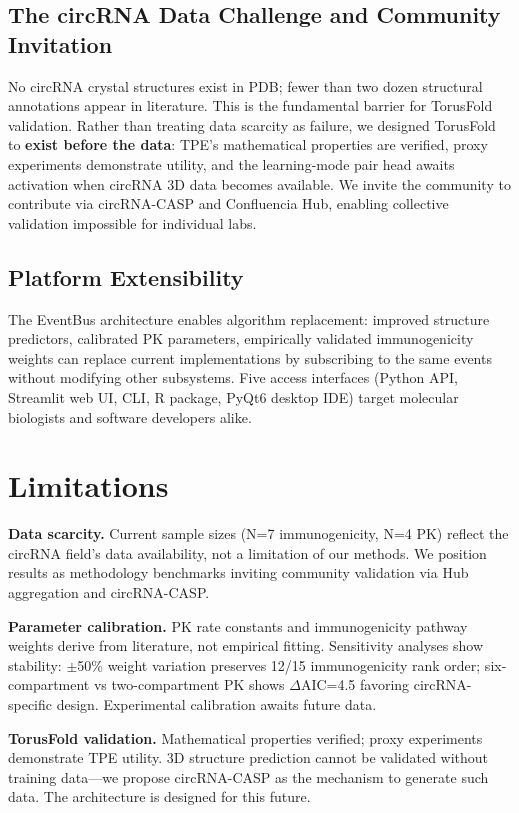\documentclass[12pt,a4paper]{article}
\begin{document}
\subsection{The circRNA Data Challenge and Community Invitation}

No circRNA crystal structures exist in PDB; fewer than two dozen structural annotations appear in literature. This is the fundamental barrier for TorusFold validation. Rather than treating data scarcity as failure, we designed TorusFold to \textbf{exist before the data}: TPE's mathematical properties are verified, proxy experiments demonstrate utility, and the learning-mode pair head awaits activation when circRNA 3D data becomes available. We invite the community to contribute via circRNA-CASP and Confluencia Hub, enabling collective validation impossible for individual labs.

\subsection{Platform Extensibility}

The EventBus architecture enables algorithm replacement: improved structure predictors, calibrated PK parameters, empirically validated immunogenicity weights can replace current implementations by subscribing to the same events without modifying other subsystems. Five access interfaces (Python API, Streamlit web UI, CLI, R package, PyQt6 desktop IDE) target molecular biologists and software developers alike.

\section{Limitations}

\textbf{Data scarcity.} Current sample sizes (N=7 immunogenicity, N=4 PK) reflect the circRNA field's data availability, not a limitation of our methods. We position results as methodology benchmarks inviting community validation via Hub aggregation and circRNA-CASP.

\textbf{Parameter calibration.} PK rate constants and immunogenicity pathway weights derive from literature, not empirical fitting. Sensitivity analyses show stability: $\pm$50\% weight variation preserves 12/15 immunogenicity rank order; six-compartment vs two-compartment PK shows $\Delta$AIC=4.5 favoring circRNA-specific design. Experimental calibration awaits future data.

\textbf{TorusFold validation.} Mathematical properties verified; proxy experiments demonstrate TPE utility. 3D structure prediction cannot be validated without training data—we propose circRNA-CASP as the mechanism to generate such data. The architecture is designed for this future.
\end{document}
